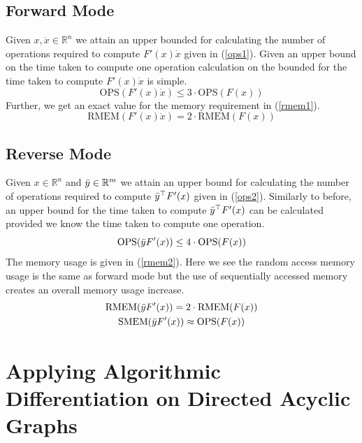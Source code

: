 \documentclass{article}
\begin{document}
\subsection{Forward Mode}

Given $x, \Dot{x} \in \mathbb{R}^n$ we attain an upper bounded for calculating the number of operations required to compute $F'(x) \Dot{x}$ given in (\ref{ops1}). Given an upper bound on the time taken to compute one operation calculation on the bounded for the time taken to compute $F'(x) \Dot{x}$ is simple.
\begin{equation} \label{ops1}
    \text{OPS}(F'(x) \Dot{x}) \leq 3 \cdot \text{OPS}(F(x))
\end{equation}
Further, we get an exact value for the memory requirement in (\ref{rmem1}).
\begin{equation} \label{rmem1}
    \text{RMEM}(F'(x) \Dot{x}) = 2 \cdot \text{RMEM}(F(x))
\end{equation}

\subsection{Reverse Mode}

Given $x \in \mathbb{R}^n$ and $\Bar{y} \in \mathbb{R}^m$ we attain an upper bound for calculating the number of operations required to compute $\Bar{y}^\top F'(x)$ given in (\ref{ops2}). Similarly to before, an upper bound for the time taken to compute $\Bar{y}^\top F'(x)$ can be calculated provided we know the time taken to compute one operation.
\begin{equation} \label{ops2}
    \text{OPS}(\Bar{y} F'(x)) \leq 4 \cdot \text{OPS}(F(x))
\end{equation}
The memory usage is given in (\ref{rmem2}). Here we see the random access memory usage is the same as forward mode but the use of sequentially accessed memory creates an overall memory usage increase.
\begin{equation} \label{rmem2}
    \begin{gathered}
        \text{RMEM}(\Bar{y} F'(x)) = 2 \cdot \text{RMEM}(F(x)) \\ 
        \text{SMEM}(\Bar{y} F'(x)) \approx \text{OPS}(F(x))
    \end{gathered}
\end{equation}

\section{Applying Algorithmic Differentiation on Directed Acyclic Graphs}
\end{document}
